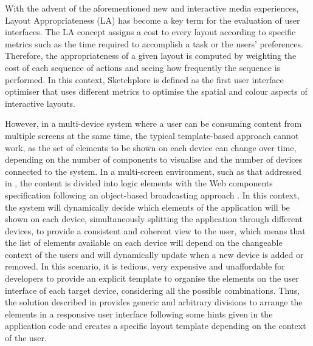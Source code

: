 With the advent of the aforementioned new and interactive media experiences, Layout Appropriateness (LA) \cite{sears1993layout} has become a key term for the evaluation of user interfaces. The LA concept assigns a cost to every layout according to specific metrics such as the time required to accomplish a task or the users' preferences. Therefore, the appropriateness of a given layout is computed by weighting the cost of each sequence of actions and seeing how frequently the sequence is performed. In this context, Sketchplore \cite{todi2016sketchplore} is defined as the first user interface optimiser that uses different metrics to optimise the spatial and colour aspects of interactive layouts. 

However, in a multi-device system where a user can be consuming content from multiple screens at the same time, the typical template-based approach cannot work, as the set of elements to be shown on each device can change over time, depending on the number of components to visualise and the number of devices connected to the system.
In a multi-screen environment, such as that addressed in \cite{Zorrilla2015}, the content is divided into logic elements with the Web components specification \cite{webcomps} following an object-based broadcasting approach \cite{armstrong2014object}. In this context, the system will dynamically decide which elements of the application will be shown on each device, simultaneously splitting the application through different devices, to provide a consistent and coherent view to the user, which means that the list of elements available on each device will depend on the changeable context of the users and will dynamically update when a new device is added or removed. In this scenario, it is tedious, very expensive and unaffordable for developers to provide an explicit template to organise the elements on the user interface of each target device, considering all the possible combinations. Thus, the solution described in \cite{Zorrilla2015} provides generic and arbitrary divisions to arrange the elements in a responsive user interface following some hints given in the application code and creates a specific layout template depending on the context of the user.

